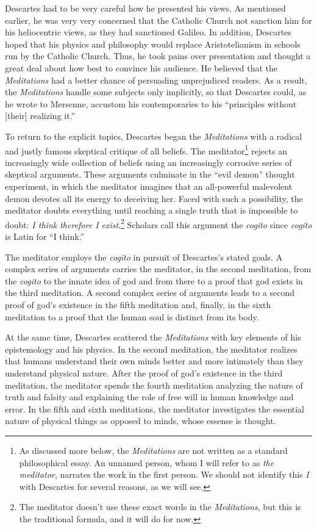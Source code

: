 Descartes had to be very careful how he presented his views. As mentioned earlier, he was very very concerned that the Catholic Church not sanction him for his heliocentric views, as they had sanctioned Galileo. In addition, Descartes hoped that his physics and philosophy would replace Aristotelianism in schools run by the Catholic Church. Thus, he took pains over presentation and thought a great deal about how best to convince his audience. He believed that the \textit{Meditations} had a better chance of persuading unprejudiced readers. As a result, the \textit{Meditations} handle some subjects only implicitly, so that Descartes could, as he wrote to Mersenne, accustom his contemporaries to his ``principles without [their] realizing it.''

To return to the explicit topics, Descartes began the \textit{Meditations} with a radical and justly famous skeptical critique of all beliefs. The meditator\footnote{As discussed more below, the \textit{Meditations} are not written as a standard philosophical essay. An unnamed person, whom I will refer to as \textit{the meditator}, narrates the work in the first person. We should not identify this \textit{I} with Descartes for several reasons, as we will see.} rejects an increasingly wide collection of beliefs using an increasingly corrosive series of skeptical arguments. These arguments culminate in the ``evil demon'' thought experiment, in which the meditator imagines that an all-powerful malevolent demon devotes all its energy to deceiving her. Faced with such a possibility, the meditator doubts everything until reaching a single truth that is impossible to doubt: \textit{I think therefore I exist}.\footnote{The meditator doesn't use these exact words in the \textit{Meditations}, but this is the traditional formula, and it will do for now.} Scholars call this argument the \textit{cogito} since \textit{cogito} is Latin for ``I think.''

The meditator employs the \textit{cogito} in pursuit of Descartes's stated goals. A complex series of arguments carries the meditator, in the second meditation, from the \textit{cogito} to the innate idea of god and from there to a proof that god exists in the third meditation. A second complex series of arguments leads to a second proof of god's existence in the fifth meditation and, finally, in the sixth meditation to a proof that the human soul is distinct from its body.

At the same time, Descartes scattered the \textit{Meditations} with key elements of his epistemology and his physics. In the second meditation, the meditator realizes that humans understand their own minds better and more intimately than they understand physical nature. After the proof of god's existence in the third meditation, the meditator spends the fourth meditation analyzing the nature of truth and falsity and explaining the role of free will in human knowledge and error. In the fifth and sixth meditations, the meditator investigates the essential nature of physical things as opposed to minds, whose essense is thought.

